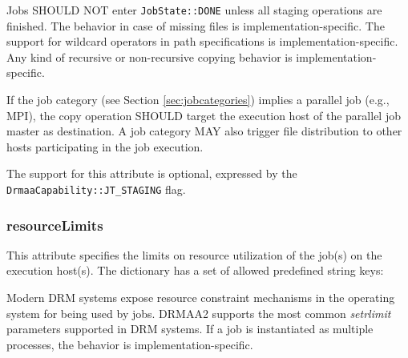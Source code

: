 \documentclass{article}
\newcommand{\h}[1]{\lstinline|#1|}
\newcommand{\rat}[1]{}
\begin{document}
Jobs SHOULD NOT enter \h{JobState::DONE} unless all staging operations are finished. The behavior in case of missing files is implementation-specific. The support for wildcard operators in path specifications is implementation-specific. Any kind of recursive or non-recursive copying behavior is implementation-specific.

If the job category (see Section \ref{sec:jobcategories}) implies a parallel job (e.g., MPI), the copy operation SHOULD target the execution host of the parallel job master as destination. A job category MAY also trigger file distribution to other hosts participating in the job execution.

The support for this attribute is optional, expressed by the \h{DrmaaCapability::JT_STAGING} flag.

\rat{
Comparison to DRMAA 1.0: New job template attributes for file transfers were introduced. They allow to express a set of file staging activities, similar to the approach in LSF and SAGA. They replace the old transferFiles attribute, the according FileTransferMode data structure and the special host definition syntax in inputPath / outputPath / errorPath (different conf. calls, SAGA F2F meeting, solves issue \#5876)
}

\subsubsection{resourceLimits}
\label{sec:resourcelimit}

This attribute specifies the limits on resource utilization of the job(s) on the execution host(s). The dictionary has a set of allowed predefined string keys:



Modern DRM systems expose resource constraint mechanisms in the operating system for being used by jobs. DRMAA2 supports the most common \emph{setrlimit} parameters \cite{posixutils} supported in DRM systems. If a job is instantiated as multiple processes, the behavior is implementation-specific.

\rat{
The June 2011 face-to-face meeting had hard discussion on the relation between operating system processes, jobs, and slots. It was decided that slot is a truly opaque concept, which means that you cannot do resource constraints on something that is implementation-specific. Therefore, the spec semantics must focus on jobs only, and leave the interpretation to the DRM system / DRMAA implementation.This leads to some intentionally fuzzy  descriptions.
}
\end{document}
